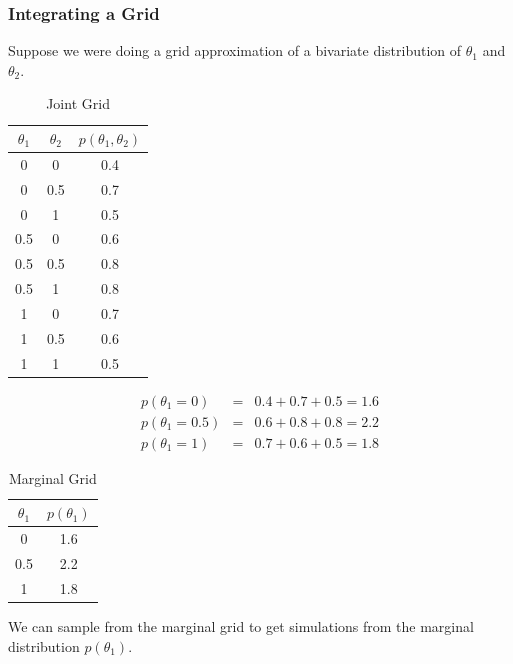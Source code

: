 \documentclass[handout]{beamer}
\begin{document}
\begin{frame}
\frametitle{Integrating a Grid}
\pause
Suppose we were doing a grid approximation of a bivariate distribution
of $\theta_1$ and $\theta_2$. \\
\begin{multicols}{2}
\pause
\scriptsize
\begin{table}[!htp]
\begin{center}
\caption{Joint Grid}
\begin{tabular}{|c|c|c|}
\hline
$\theta_1$ & $\theta_2$ & $p(\theta_1, \theta_2)$\\
\hline
0 & 0 & 0.4 \\
0 & 0.5 & 0.7\\
0 & 1 & 0.5\\
0.5 & 0 & 0.6\\
0.5 & 0.5 & 0.8\\
0.5 & 1 & 0.8\\
1 & 0 & 0.7\\
1 & 0.5 & 0.6\\
1 & 1 & 0.5\\
\hline
\end{tabular}
\end{center}
\end{table}
\pause
\begin{eqnarray*}
p(\theta_1 = 0) &=& 0.4 + 0.7 + 0.5 = 1.6\\
p(\theta_1 = 0.5) &=& 0.6+0.8+0.8 = 2.2\\
p(\theta_1 = 1) &=& 0.7+0.6+0.5 = 1.8
\end{eqnarray*}
\pause
\begin{table}[!htp]
\begin{center}
\caption{Marginal Grid}
\begin{tabular}{|c|c|}
\hline
$\theta_1$  & $p(\theta_1)$\\
\hline
0 & 1.6\\
0.5 & 2.2\\
1 & 1.8\\
\hline
\end{tabular}
\end{center}
\end{table}
\end{multicols}
\pause
\normalsize
We can sample from the marginal grid to get simulations from the
marginal distribution $p(\theta_1)$. 
\end{frame}
\end{document}
